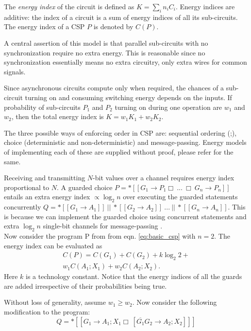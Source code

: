 The \emph{energy index} of the circuit is defined as $K = \sum_i n_i C_i$.
Energy indices are additive: the index of a circuit is a sum of energy indices
of all its sub-circuits. The energy index of a CSP $P$ is denoted by $C(P)$.

A central assertion of this model is that parallel sub-circuits with no
synchronization require no extra energy. 
This is reasonable since no synchronization essentially means no
extra circuitry, only extra wires for common signals. 

Since asynchronous circuits compute only when required, the chances of a sub-circuit 
turning on and consuming switching energy depends on the inputs. If probability
of sub-circuits $P_1$ and $P_2$ turning on during one operation are $w_1$
and $w_2$, then the total energy index is $K = w_1 K_1 + w_2 K_2$.

The three possible ways of enforcing order in CSP are: sequential ordering
(;), choice (deterministic and non-deterministic) and message-passing. Energy 
models of implementing each of these are supplied without proof, please refer 
\cite{entropy_paper} for the same.

Receiving and transmitting $N$-bit values over a channel requires energy
index proportional to $N$. 
A guarded choice $P = *[[G_1 \to P_1 \Box\ ...\ \Box\ G_n \to P_n]]$
entails an extra energy index $\propto \log_2 {n}$ over executing the guarded 
statements concurrently 
$Q = *[[G_1 \to A_1 ]]\ ||\ *[[G_2 \to A_2]]\ ...\ ||\ *[[ G_n \to A_n]]$.
This is because we can implement the guarded choice using concurrent
statements and extra $\log_2{n}$ single-bit channels for message-passing
\cite{entropy_thesis}.
\\

Now consider the program P from from eqn. \ref{eq:basic_csp} with $n = 2$. The energy index
can be evaluated as 
\begin{equation}
\begin{split}
	C(P) = C(G_1) + C(G_2) + k \log_2{2} +\\
	w_1 C(A_1; X_1) + w_2 C(A_2; X_2).
\end{split}
\end{equation}
Here $k$ is a technology constant. Notice that the energy indices of all the
guards are added irrespective of their probabilities being true.

Without loss of generality, assume $w_1 \ge w_2$. 
Now consider the following modification to the program:
\begin{equation}
	Q = *[[ G_1 \to A_1; X_1 \Box\ [ \overline{G_1} G_2 \to A_2; X_2] ]]
\end{equation}

